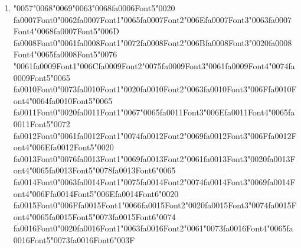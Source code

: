 \documentclass[12pt]{article}
\begin{document}
\begin{enumerate}[label=Q\arabic*.]
\item {\char"0057}{\char"0068}{\char"0069}{\char"0063}{\char"0068}{\csname fa0006Font5\endcsname\char"0020} {\csname fa0007Font0\endcsname\char"0062}{\csname fa0007Font1\endcsname\char"0065}{\csname fa0007Font2\endcsname\char"006E}{\csname fa0007Font3\endcsname\char"0063}{\csname fa0007Font4\endcsname\char"0068}{\csname fa0007Font5\endcsname\char"006D} {\csname fa0008Font0\endcsname\char"0061}{\csname fa0008Font1\endcsname\char"0072}{\csname fa0008Font2\endcsname\char"006B}{\csname fa0008Font3\endcsname\char"0020}{\csname fa0008Font4\endcsname\char"0065}{\csname fa0008Font5\endcsname\char"0076} {\char"0061}{\csname fa0009Font1\endcsname\char"006C}{\csname fa0009Font2\endcsname\char"0075}{\csname fa0009Font3\endcsname\char"0061}{\csname fa0009Font4\endcsname\char"0074}{\csname fa0009Font5\endcsname\char"0065} {\csname fa0010Font0\endcsname\char"0073}{\csname fa0010Font1\endcsname\char"0020}{\csname fa0010Font2\endcsname\char"0063}{\csname fa0010Font3\endcsname\char"006F}{\csname fa0010Font4\endcsname\char"0064}{\csname fa0010Font5\endcsname\char"0065} {\csname fa0011Font0\endcsname\char"0020}{\csname fa0011Font1\endcsname\char"0067}{\char"0065}{\csname fa0011Font3\endcsname\char"006E}{\csname fa0011Font4\endcsname\char"0065}{\csname fa0011Font5\endcsname\char"0072} {\csname fa0012Font0\endcsname\char"0061}{\csname fa0012Font1\endcsname\char"0074}{\csname fa0012Font2\endcsname\char"0069}{\csname fa0012Font3\endcsname\char"006F}{\csname fa0012Font4\endcsname\char"006E}{\csname fa0012Font5\endcsname\char"0020} {\csname fa0013Font0\endcsname\char"0076}{\csname fa0013Font1\endcsname\char"0069}{\csname fa0013Font2\endcsname\char"0061}{\csname fa0013Font3\endcsname\char"0020}{\csname fa0013Font4\endcsname\char"0065}{\csname fa0013Font5\endcsname\char"0078}{\csname fa0013Font6\endcsname\char"0065} {\csname fa0014Font0\endcsname\char"0063}{\csname fa0014Font1\endcsname\char"0075}{\csname fa0014Font2\endcsname\char"0074}{\csname fa0014Font3\endcsname\char"0069}{\csname fa0014Font4\endcsname\char"006F}{\csname fa0014Font5\endcsname\char"006E}{\csname fa0014Font6\endcsname\char"0020} {\csname fa0015Font0\endcsname\char"006F}{\csname fa0015Font1\endcsname\char"0066}{\csname fa0015Font2\endcsname\char"0020}{\csname fa0015Font3\endcsname\char"0074}{\csname fa0015Font4\endcsname\char"0065}{\csname fa0015Font5\endcsname\char"0073}{\csname fa0015Font6\endcsname\char"0074} {\csname fa0016Font0\endcsname\char"0020}{\csname fa0016Font1\endcsname\char"0063}{\csname fa0016Font2\endcsname\char"0061}{\char"0073}{\csname fa0016Font4\endcsname\char"0065}{\csname fa0016Font5\endcsname\char"0073}{\csname fa0016Font6\endcsname\char"003F}

\end{enumerate}
\end{document}
